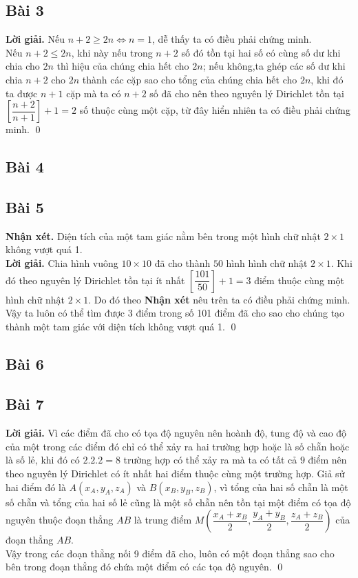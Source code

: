 \documentclass[a4paper,14pt]{article}
\begin{document}
    \subsection{Bài 3}
        \textbf{Lời giải.}
            Nếu $n+2\geqslant 2n \Leftrightarrow n=1$, dễ thấy ta có điều phải chứng minh. \\
            Nếu $n+2\leqslant 2n$, khi này nếu trong $n+2$ số đó tồn tại hai số có cùng số dư khi chia cho $2n$ thì hiệu của chúng chia hết cho $2n$; nếu không,ta ghép các số dư khi chia $n+2$ cho $2n$ thành các cặp sao cho tổng của chúng chia hết cho $2n$, khi đó ta được $n+1$ cặp mà ta có $n+2$ số đã cho nên theo nguyên lý Dirichlet tồn tại $\left[\dfrac{n+2}{n+1}\right]+1=2$ số thuộc cùng một cặp, từ đây hiển nhiên ta có điều phải chứng minh.
            \qed
    \subsection{Bài 4}

    \subsection{Bài 5}
        \textbf{Nhận xét.} Diện tích của một tam giác nằm bên trong một hình chữ nhật $2\times 1$ không vượt quá 1.
        \\
        \textbf{Lời giải.}
            Chia hình vuông $10\times 10$ đã cho thành $50$ hình hình chữ nhật $2\times 1$. Khi đó theo nguyên lý Dirichlet tồn tại ít nhất $\left[\dfrac{101}{50}\right]+1=3$ điểm thuộc cùng một hình chữ nhật $2\times 1$. Do đó theo \textbf{Nhận xét} nêu trên ta có điều phải chứng minh. \\
            Vậy ta luôn có thể tìm được 3 điểm trong số 101 điểm đã cho sao cho chúng tạo thành một tam giác với diện tích không vượt quá 1.
        \qed
    \subsection{Bài 6}

    \subsection{Bài 7}
        \textbf{Lời giải.}
            Vì các điểm đã cho có tọa độ nguyên nên hoành độ, tung độ và cao độ của một trong các điểm đó chỉ có thể xảy ra hai trường hợp hoặc là số chẵn hoặc là số lẻ, khi đó có $2.2.2=8$ trường hợp có thể xảy ra mà ta có tất cả $9$ điểm nên theo nguyên lý Dirichlet có ít nhất hai điểm thuộc cùng một trường hợp. Giả sử hai điểm đó là $A(x_A,y_A,z_A)$ và $B(x_B,y_B,z_B)$, vì tổng của hai số chẵn là một số chẵn và tổng của hai số lẻ cũng là một số chẵn nên tồn tại một điểm có tọa độ nguyên thuộc đoạn thẳng $AB$ là trung điểm $M\left(\dfrac{x_A+x_B}{2},\dfrac{y_A+y_B}{2},\dfrac{z_A+z_B}{2}\right)$ của đoạn thẳng $AB$. \\
            Vậy trong các đoạn thẳng nối 9 điểm đã cho, luôn có một đoạn thẳng sao cho bên trong đoạn thẳng đó chứa một điểm có các tọa độ nguyên.
        \qed
\end{document}
